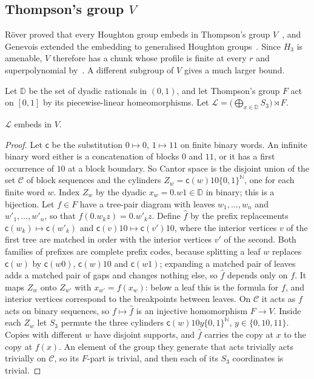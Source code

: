 \subsection{Thompson's group \texorpdfstring{$V$}{V}}\label{sec:thompson}

R\"over proved that every Houghton group embeds in Thompson's group $V$~\cite[Proposition~2.6]{Rover1999}, and Genevois extended the
embedding to generalised Houghton groups~\cite[Corollary~5.11]{Genevois2019}. Since $H_3$ is amenable, $V$ therefore has a
chunk whose profile is finite at every $r$ and superpolynomial by~\cite[Theorem~1.1]{DouglasMghirbiA}. A different subgroup of $V$ gives a much larger bound.

Let $\mathbb D$ be the set of dyadic rationals in $(0,1)$, and let Thompson's group $F$ act on $[0,1]$ by its piecewise-linear
homeomorphisms. Let $\mathcal L=\bigl(\bigoplus_{x\in\mathbb D}S_3\bigr)\rtimes F$.

\begin{lemma}\label{lem:gap-coding}
$\mathcal L$ embeds in $V$.
\end{lemma}

\begin{proof}
Let $\mathsf c$ be the substitution $0\mapsto0$, $1\mapsto11$ on finite binary words. An infinite binary word either is a concatenation of
blocks $0$ and $11$, or it has a first occurrence of $10$ at a block boundary. So Cantor space is the disjoint union of the set $\mathcal C$ of
block sequences and the cylinders $Z_w=\mathsf c(w)10\{0,1\}^{\mathbb N}$, one for each finite word $w$. Index $Z_w$ by the dyadic
$x_w=0.w1\in\mathbb D$ in binary; this is a bijection. Let $f\in F$ have a tree-pair diagram with leaves $w_1,\dots,w_n$ and $w'_1,\dots,w'_n$,
so that $f(0.w_kz)=0.w'_kz$. Define $\hat f$ by the prefix replacements $\mathsf c(w_k)\mapsto\mathsf c(w'_k)$ and
$\mathsf c(v)10\mapsto\mathsf c(v')10$, where the interior vertices $v$ of the first tree are matched in order with the interior vertices $v'$ of
the second. Both families of prefixes are complete prefix codes, because splitting a leaf $w$ replaces $\mathsf c(w)$ by $\mathsf c(w0)$,
$\mathsf c(w)10$ and $\mathsf c(w1)$; expanding a matched pair of leaves adds a matched pair of gaps and changes nothing else, so $\hat f$ depends
only on $f$. It maps $Z_w$ onto $Z_{w'}$ with $x_{w'}=f(x_w)$: below a leaf this is the formula for $f$, and interior vertices correspond to the
breakpoints between leaves. On $\mathcal C$ it acts as $f$ acts on binary sequences, so $f\mapsto\hat f$ is an injective homomorphism $F\to V$.
Inside each $Z_w$ let $S_3$ permute the three cylinders $\mathsf c(w)10y\{0,1\}^{\mathbb N}$, $y\in\{0,10,11\}$. Copies with different $w$ have
disjoint supports, and $\hat f$ carries the copy at $x$ to the copy at $f(x)$. An element of the group they generate that acts trivially acts
trivially on $\mathcal C$, so its $F$-part is trivial, and then each of its $S_3$ coordinates is trivial.
\end{proof}

